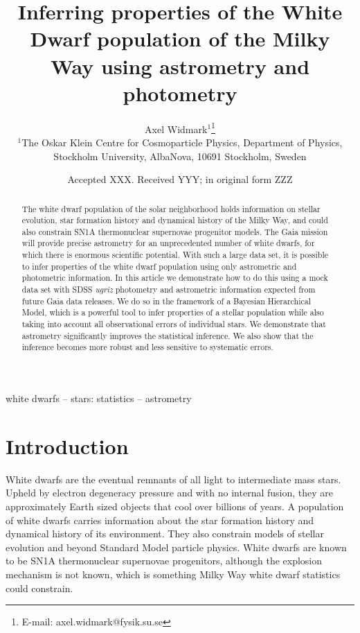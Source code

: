 \documentclass[fleqn,usenatbib]{mnras}
\title[Inferring properties of the White Dwarf population]{Inferring properties of the White Dwarf population of the Milky Way using astrometry and photometry}
\author[A. Widmark]{
Axel Widmark$^1$\thanks{E-mail: axel.widmark@fysik.su.se} 
\\
$^1$The Oskar Klein Centre for Cosmoparticle Physics, Department of
Physics, Stockholm University, AlbaNova, 10691 Stockholm, Sweden\\
}
\date{Accepted XXX. Received YYY; in original form ZZZ}
\begin{document}
\label{firstpage}
\pagerange{\pageref{firstpage}--\pageref{lastpage}}
\maketitle

\begin{abstract}
The white dwarf population of the solar neighborhood holds information on stellar evolution, star formation history and dynamical history of the Milky Way, and could also constrain SN1A thermonuclear supernovae progenitor models.
The Gaia mission will provide precise astrometry for an unprecedented number of white dwarfs, for which there is enormous scientific potential. With such a large data set, it is possible to infer properties of the white dwarf population using only astrometric and photometric information. In this article we demonstrate how to do this using a mock data set with SDSS \emph{ugriz} photometry and astrometric information expected from future Gaia data releases.
We do so in the framework of a Bayesian Hierarchical Model, which is a powerful tool to infer properties of a stellar population while also taking into account all observational errors of individual stars. We demonstrate that astrometry significantly improves the statistical inference. We also show that the inference becomes more robust and less sensitive to systematic errors.
\end{abstract}

\begin{keywords}
white dwarfs -- stars: statistics -- astrometry
\end{keywords}









\section{Introduction}

White dwarfs are the eventual remnants of all light to intermediate mass stars. Upheld by electron degeneracy pressure and with no internal fusion, they are approximately Earth sized objects that cool over billions of years. A population of white dwarfs carries information about the star formation history and dynamical history of its environment. They also constrain models of stellar evolution and beyond Standard Model particle physics. White dwarfs are known to be SN1A thermonuclear supernovae progenitors, although the explosion mechanism is not known, which is something Milky Way white dwarf statistics could constrain.
\end{document}
